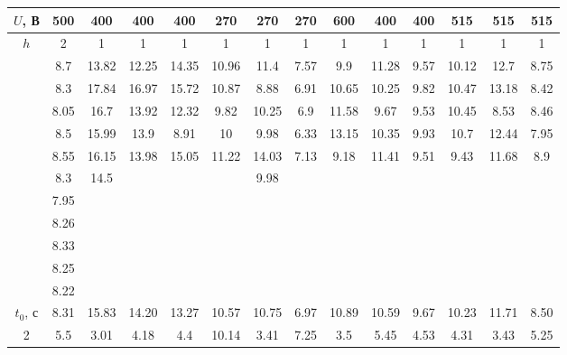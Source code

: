 \documentclass[a4paper,12pt]{article} %
\begin{document}
\begin{table}[h]
	\centering
	\begin{tabular}{|c|c|c|c|c|c|c|c|c|c|c|c|c|c|}
		\hline
		$U$, В               & 500  & 400   & 400   & 400   & 270    & 270   & 270  & 600   & 400   & 400  & 515   & 515   & 515  \\ \hline
		$h$    & 2    & 1     & 1     & 1     & 1      & 1     & 1    & 1     & 1     & 1    & 1     & 1     & 1    \\ \hline
		\multirow{11}{*}{} & 8.7  & 13.82 & 12.25 & 14.35 & 10.96  & 11.4  & 7.57 & 9.9   & 11.28 & 9.57 & 10.12 & 12.7  & 8.75 \\ \cline{2-14} 
		& 8.3  & 17.84 & 16.97 & 15.72 & 10.87  & 8.88  & 6.91 & 10.65 & 10.25 & 9.82 & 10.47 & 13.18 & 8.42 \\ \cline{2-14} 
		& 8.05 & 16.7  & 13.92 & 12.32 & 9.82   & 10.25 & 6.9  & 11.58 & 9.67  & 9.53 & 10.45 & 8.53  & 8.46 \\ \cline{2-14} 
		& 8.5  & 15.99 & 13.9  & 8.91  & 10     & 9.98  & 6.33 & 13.15 & 10.35 & 9.93 & 10.7  & 12.44 & 7.95 \\ \cline{2-14} 
		& 8.55 & 16.15 & 13.98 & 15.05 & 11.22  & 14.03 & 7.13 & 9.18  & 11.41 & 9.51 & 9.43  & 11.68 & 8.9  \\ \cline{2-14} 
		& 8.3  & 14.5  &       &       &        & 9.98  &      &       &       &      &       &       &      \\ \cline{2-14} 
		& 7.95 &       &       &       &        &       &      &       &       &      &       &       &      \\ \cline{2-14} 
		& 8.26 &       &       &       &        &       &      &       &       &      &       &       &      \\ \cline{2-14} 
		& 8.33 &       &       &       &        &       &      &       &       &      &       &       &      \\ \cline{2-14} 
		& 8.25 &       &       &       &        &       &      &       &       &      &       &       &      \\ \cline{2-14} 
		& 8.22 &       &       &       &        &       &      &       &       &      &       &       &      \\ \hline
		$t_0$, с              & 8.31 & 15.83 & 14.20 & 13.27 & 10.57  & 10.75 & 6.97 & 10.89 & 10.59 & 9.67 & 10.23 & 11.71 & 8.50 \\ \hline
		2            & 5.5  & 3.01  & 4.18  & 4.4   & 10.14  & 3.41  & 7.25 & 3.5   & 5.45  & 4.53 & 4.31  & 3.43  & 5.25 \\ \hline

\end{tabular}
\end{table}
\end{document}
